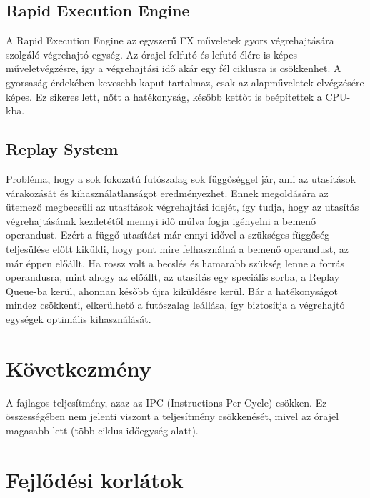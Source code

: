 \subsection{Rapid Execution Engine}
A Rapid Execution Engine az egyszerű FX műveletek gyors végrehajtására szolgáló végrehajtó egység.
Az órajel felfutó és lefutó élére is képes műveletvégzésre, így a végrehajtási idő akár egy fél ciklusra is csökkenhet.
A gyorsaság érdekében kevesebb kaput tartalmaz, csak az alapműveletek elvégzésére képes.
Ez sikeres lett, nőtt a hatékonyság, később kettőt is beépítettek a CPU-kba.

\subsection{Replay System}
Probléma, hogy a sok fokozatú futószalag sok függőséggel jár, ami az utasítások várakozását és kihasználatlanságot eredményezhet.
Ennek megoldására az ütemező megbecsüli az utasítások végrehajtási idejét, így tudja, hogy az utasítás végrehajtásának kezdetétől mennyi idő múlva fogja igényelni a bemenő operandust.
Ezért a függő utasítást már ennyi idővel a szükséges függőség teljesülése előtt kiküldi, hogy pont mire felhasználná a bemenő operandust, az már éppen előállt.
Ha rossz volt a becslés és hamarabb szükség lenne a forrás operandusra, mint ahogy az előállt, az utasítás egy speciális sorba, a Replay Queue-ba kerül, ahonnan később újra kiküldésre kerül.
Bár a hatékonyságot mindez csökkenti, elkerülhető a futószalag leállása, így biztosítja a végrehajtó egységek optimális kihasználását.

\section{Következmény}
A fajlagos teljesítmény, azaz az IPC (Instructions Per Cycle) csökken. Ez összességében nem jelenti viszont a teljesítmény csökkenését, mivel az órajel magasabb lett (több ciklus időegység alatt).

\section{Fejlődési korlátok}

